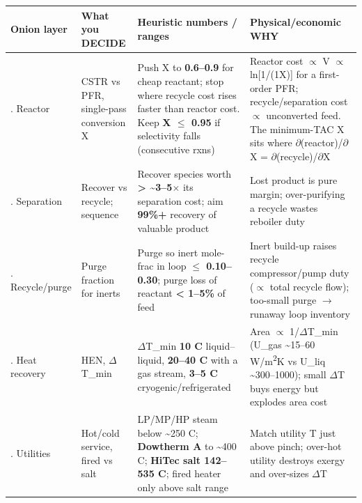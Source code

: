 \documentclass[11pt,a4paper]{article}
\begin{document}
\begin{longtable}[]{@{}>{\raggedright\arraybackslash}p{\dimexpr(\linewidth-8\tabcolsep)/4\relax}>{\raggedright\arraybackslash}p{\dimexpr(\linewidth-8\tabcolsep)/4\relax}>{\raggedright\arraybackslash}p{\dimexpr(\linewidth-8\tabcolsep)/4\relax}>{\raggedright\arraybackslash}p{\dimexpr(\linewidth-8\tabcolsep)/4\relax}@{}}
\toprule\noalign{}
Onion layer & What you DECIDE & Heuristic numbers / ranges &
Physical/economic WHY \\
\midrule\noalign{}
\endhead
\bottomrule\noalign{}
\endlastfoot
1. Reactor & CSTR vs PFR, single-pass conversion X & Push X to
\textbf{0.6--0.9} for cheap reactant; stop where recycle cost rises
faster than reactor cost. Keep \textbf{X \(\le\) 0.95} if selectivity falls
(consecutive rxns) & Reactor cost \(\propto\) V \(\propto\) ln{[}1/(1\textminus{}X){]} for a first-order PFR;
recycle/separation cost \(\propto\) unconverted feed. The minimum-TAC X sits where
\(\partial\)(reactor)/\(\partial\)X = \textminus{}\(\partial\)(recycle)/\(\partial\)X \\
2. Separation & Recover vs recycle; sequence & Recover species worth
\textbf{\textgreater{} \textasciitilde3--5\(\times\)} its separation cost; aim
\textbf{99\%+} recovery of valuable product & Lost product is pure
margin; over-purifying a recycle wastes reboiler duty \\
3. Recycle/purge & Purge fraction for inerts & Purge so inert mole-frac
in loop \textbf{\(\le\) 0.10--0.30}; purge loss of reactant
\textbf{\textless{} 1--5\%} of feed & Inert build-up raises recycle
compressor/pump duty (\(\propto\) total recycle flow); too-small purge \(\rightarrow\) runaway
loop inventory \\
4. Heat recovery & HEN, \(\Delta\)T\_min & \(\Delta\)T\_min \textbf{10 \textdegree{}C} liquid--liquid,
\textbf{20--40 \textdegree{}C} with a gas stream, \textbf{3--5 \textdegree{}C}
cryogenic/refrigerated & Area \(\propto\) 1/\(\Delta\)T\_min (U\_gas \textasciitilde15--60
W/m\textsuperscript{2}K vs U\_liq \textasciitilde300--1000); small \(\Delta\)T buys energy but
explodes area cost \\
5. Utilities & Hot/cold service, fired vs salt & LP/MP/HP steam below
\textasciitilde250 \textdegree{}C; \textbf{Dowtherm A} to \textasciitilde400 \textdegree{}C;
\textbf{HiTec salt 142--535 \textdegree{}C}; fired heater only above salt range &
Match utility T just above pinch; over-hot utility destroys exergy and
over-sizes \(\Delta\)T \\
\end{longtable}
\end{document}
